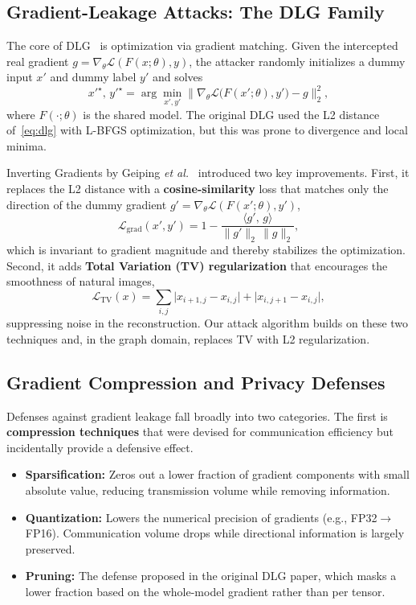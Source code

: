 \documentclass[conference]{IEEEtran}
\begin{document}
\subsection{Gradient-Leakage Attacks: The DLG Family}
The core of DLG~\cite{zhu2019dlg} is optimization via gradient matching. Given
the intercepted real gradient $g=\nabla_\theta\mathcal{L}(F(x;\theta),y)$, the
attacker randomly initializes a dummy input $x'$ and dummy label $y'$ and solves
\begin{equation}
x'^\star,\,y'^\star=\arg\min_{x',y'}
\big\| \nabla_\theta \mathcal{L}\big(F(x';\theta),y'\big) - g \big\|_2^2 ,
\label{eq:dlg}
\end{equation}
where $F(\cdot;\theta)$ is the shared model. The original DLG used the L2
distance of~\eqref{eq:dlg} with L-BFGS optimization, but this was prone to
divergence and local minima.

Inverting Gradients by Geiping
\textit{et al.}~\cite{geiping2020inverting} introduced two key improvements.
First, it replaces the L2 distance with a \textbf{cosine-similarity} loss that
matches only the direction of the dummy gradient $g'=\nabla_\theta\mathcal{L}
(F(x';\theta),y')$,
\begin{equation}
\mathcal{L}_{\mathrm{grad}}(x',y')=1-\frac{\langle g',\,g\rangle}{\|g'\|_2\,\|g\|_2},
\label{eq:cosloss}
\end{equation}
which is invariant to gradient magnitude and thereby stabilizes the
optimization. Second, it adds \textbf{Total Variation (TV) regularization} that
encourages the smoothness of natural images,
\begin{equation}
\mathcal{L}_{\mathrm{TV}}(x)=\sum_{i,j}\big|x_{i+1,j}-x_{i,j}\big|
+\big|x_{i,j+1}-x_{i,j}\big| ,
\label{eq:tv}
\end{equation}
suppressing noise in the reconstruction. Our attack algorithm builds on these two
techniques and, in the graph domain, replaces TV with L2 regularization.

\subsection{Gradient Compression and Privacy Defenses}
Defenses against gradient leakage fall broadly into two categories. The first is
\textbf{compression techniques} that were devised for communication efficiency
but incidentally provide a defensive effect.
\begin{itemize}
\item \textbf{Sparsification:} Zeros out a lower fraction of gradient components
with small absolute value, reducing transmission volume while removing
information.
\item \textbf{Quantization:} Lowers the numerical precision of gradients (e.g.,
FP32$\rightarrow$FP16). Communication volume drops while directional information
is largely preserved.
\item \textbf{Pruning:} The defense proposed in the original DLG paper, which
masks a lower fraction based on the whole-model gradient rather than per tensor.
\end{itemize}
\end{document}
